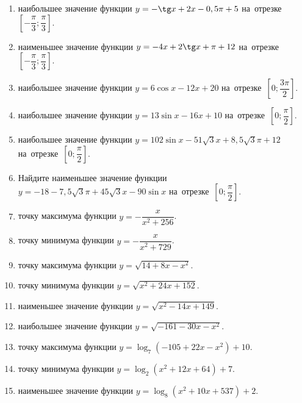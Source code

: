 \documentclass[a4paper,10pt]{article}
\begin{document}
\begin{enumerate}
\item {} наибольшее значение функции $y=-\tg x +2x-0,5\pi +5$ на~отрезке~$\left[-\dfrac{\pi}{3};\dfrac{\pi}{3}\right]$.

\item {} наименьшее значение функции $y=-4x +2\tg x+\pi+12$ на~отрезке~$\left[-\dfrac{\pi}{3};\dfrac{\pi}{3}\right]$.

\item {} наибольшее значение функции $y=6\cos x-12x+20$ на~отрезке~$\left[0;\dfrac{3\pi}{2}\right]$.

\item {} наибольшее значение функции $y=13\sin x-16x+10$ на~отрезке~$\left[0;\dfrac{\pi}{2}\right]$.

\item {} наибольшее значение функции $y=102\sin x-51\sqrt{3}x+8,5\sqrt{3}\pi +12$ на~отрезке~$\left[0;\dfrac{\pi}{2}\right]$.

\item Найдите наименьшее значение функции $y=-18-7,5\sqrt{3}\pi+45\sqrt{3}x-90\sin x$ на~отрезке~$\left[0;\dfrac{\pi}{2}\right]$.

\item {} точку максимума функции $y=-\dfrac{x}{ x^2 +256}$.

\item {} точку минимума функции $y=-\dfrac{x}{ x^2 +729}$.

\item {} точку максимума функции $y=\sqrt{14+8x-x^2}$.

\item {} точку минимума функции $y=\sqrt{x^2+24x+152}$.

\item {} наименьшее значение функции $y=\sqrt{x^2-14x+149}$.

\item {} наибольшее значение функции $y=\sqrt{-161-30x-x^2}$.

\item {} точку максимума функции $y=\log_7\left(-105+22x-x^2\right)+10$.

\item {} точку минимума функции $y=\log_2\left(x^2+12x+64\right)+7$.

\item {} наименьшее значение функции $y=\log_8\left(x^2+10x+537\right)+2$.


\end{enumerate}
\end{document}
